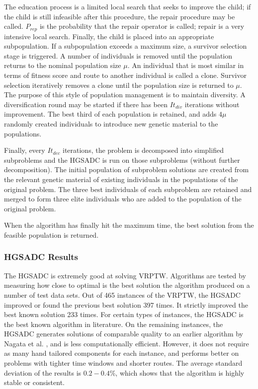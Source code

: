 \documentclass{sig-alternate}
\begin{document}
The education process is a limited local search that seeks to improve the child; if the child is still infeasible after this procedure, the repair procedure may be called. $P_{rep}$ is the probability that the repair operator is called; repair is a very intensive local search. Finally, the child is placed into an appropriate subpopulation. If a subpopulation exceeds a maximum size, a survivor selection stage is triggered. A number of individuals is removed until the population returns to the nominal population size $\mu$. An individual that is most similar in terms of fitness score and route to another individual is called a clone. Survivor selection iteratively removes a clone until the population size is returned to $\mu$. The purpose of this style of population management is to maintain diversity. A diversification round may be started if there has been $It_{div}$ iterations without improvement. The best third of each population is retained, and adds $4\mu$ randomly created individuals to introduce new genetic material to the populations. 

Finally, every $It_{dec}$ iterations, the problem is decomposed into simplified subproblems and the HGSADC is run on those subproblems (without further decomposition). The initial population of subproblem solutions are created from the relevant genetic material of existing individuals in the populations of the original problem. The three best individuals of each subproblem are retained and merged to form three elite individuals who are added to the population of the original problem.

When the algorithm has finally hit the maximum time, the best solution from the feasible population is returned.

\subsubsection{HGSADC Results} 
 The HGSADC is extremely good at solving VRPTW. Algorithms are tested by measuring how close to optimal is the best solution the algorithm produced on a number of test data sets. Out of 465 instances of the VRPTW, the HGSADC improved or found the previous best solution 397 times. It strictly improved the best known solution 233 times. For certain types of instances, the HGSADC is the best known algorithm in literature. On the remaining instances, the HGSADC generates solutions of comparable quality to an earlier algorithm by Nagata et al. \cite{Nagata:2010}, and is less computationally efficient. However, it does not require as many hand tailored components for each instance, and performs better on problems with tighter time windows and shorter routes. The average standard deviation of the results is $0.2-0.4\%$, which shows that the algorithm is highly stable or consistent. 
  
\end{document}
